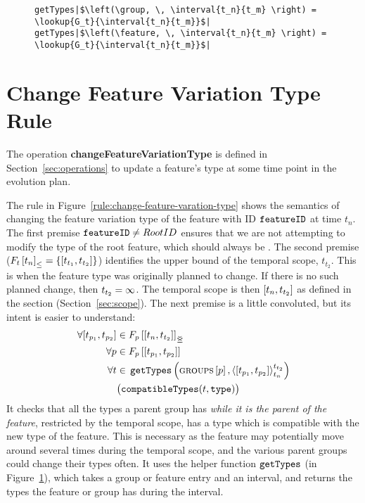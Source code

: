\begin{figure}[htbp]
  \begin{verbatim}
getTypes|$\left(\group, \, \interval{t_n}{t_m} \right) = \lookup{G_t}{\interval{t_n}{t_m}}$|
getTypes|$\left(\feature, \, \interval{t_n}{t_m} \right) = \lookup{G_t}{\interval{t_n}{t_m}}$|
  \end{verbatim}
  \caption{}
  \label{fun:get-types}
\end{figure}

\section{Change Feature Variation Type Rule}
\label{sec:change-feature-variation-type-rule}
The operation \textbf{changeFeatureVariationType} is defined in Section~\ref{sec:operations} to update a feature's type at some time point in the evolution plan.

The rule in Figure~\vref{rule:change-feature-varation-type} shows the semantics of changing the feature variation type of the feature with ID $\texttt{feature\-ID}$ at time $t_n$. The first premise $\texttt{feature\-ID} \neq Root\-ID$ ensures that we are not attempting to modify the type of the root feature, which should always be \mandatory{}. The second premise ($\containing{F_t}{t_n} = \set{\interval{t_{t_1}}{t_{t_2}}}$) identifies the upper bound of the temporal scope, $t_{t_2}$. This is when the feature type was originally planned to change. If there is no such planned change, then $t_{t_2} = \infty$. The temporal scope is then $\interval{t_n}{t_{t_2}}$ as defined in the  section (Section~\ref{sec:scope}). %
The next premise is a little convoluted, but its intent is easier to understand:
\begin{align*}
   \forall \interval{t_{p_1}}{t_{p_2}} & \in \overlapping{F_p}{t_n}{t_{t_2}}  \\ %
   \forall p & \in \lookup{F_p}{\interval{t_{p_1}}{t_{p_2}}}  \\%
   \forall t & \in \, \var{getTypes}\left(\lookup{\groups}{p}, \clamp{\interval{t_{p_1}}{t_{p_2}}}{t_n}{t_{t_2}}\right)  \\
            & \big(\var{compatibleTypes}(t, \var{type})\big) 
\end{align*}
It checks that all the types a parent group has \emph{while it is the parent of the feature}, restricted by the temporal scope, has a type which is compatible with the new type of the feature. This is necessary as the feature may potentially move around several times during the temporal scope, and the various parent groups could change their types often. It uses the helper function $\texttt{get\-Types}$ (in Figure~\ref{fun:get-types}), which takes a group or feature entry and an interval, and returns the types the feature or group has during the interval.

